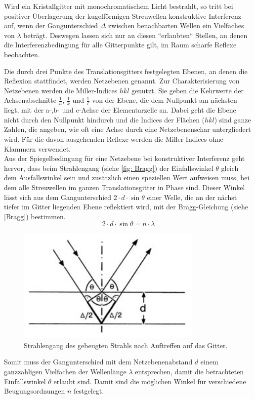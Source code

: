 \documentclass[a4paper,12pt,bibliography=totocnumbered]{scrartcl}
\begin{document}
Wird ein Kristallgitter mit monochromatischem Licht bestrahlt, so tritt bei positiver Überlagerung der kugelförmigen Streuwellen konstruktive Interferenz auf, wenn der Gangunterschied $\Delta$ zwischen benachbarten Wellen ein Vielfaches von $\lambda$ beträgt. \cite{Kristallgitter}
Deswegen lassen sich nur an diesen ``erlaubten`` Stellen, an denen die Interferenzbedingung für alle Gitterpunkte gilt, im Raum scharfe Reflexe beobachten.

Die durch drei Punkte des Translationsgitters festgelegten Ebenen, an denen die Reflexion stattfindet, werden Netzebenen genannt. 
Zur Charakterisierung von Netzebenen werden die Miller-Indices $hkl$ genutzt. Sie geben die Kehrwerte der Achsenabschnitte $\frac{1}{h}$, $\frac{1}{k}$ und $\frac{1}{l}$ von der Ebene, die dem Nullpunkt am nächsten liegt, mit der a-,b- und c-Achse der Elementarzelle an. 
Dabei geht die Ebene nicht durch den Nullpunkt hindurch und die Indices der Flächen ($hkl$) sind ganze Zahlen, die angeben, wie oft eine Achse durch eine Netzebenenschar untergliedert wird. 
Für die davon ausgehenden Reflexe werden die Miller-Indices ohne Klammern verwendet. \\
Aus der Spiegelbedingung für eine Netzebene bei konstruktiver Interferenz geht hervor, dass beim Strahlengang (siehe \autoref{fig: Bragg}) der Einfallswinkel $\theta$ gleich dem Ausfallswinkel sein und zusätzlich einen speziellen Wert aufweisen muss, bei dem alle Streuwellen im ganzen Translationsgitter in Phase sind. 
Dieser Winkel lässt sich aus dem Gangunterschied $2 \cdot d \cdot \sin \theta$ einer Welle, die an der nächst tiefer im Gitter liegenden Ebene reflektiert wird, mit der Bragg-Gleichung (siehe \autoref{Bragg}) bestimmen. 
\begin{equation}
    2 \cdot d \cdot \sin \theta = n \cdot \lambda
    \label{Bragg}
\end{equation}

\begin{figure}[H]
    \centering
    \includegraphics[scale=0.95]{Bilder/Bragg.png}
    \caption{Strahlengang des gebeugten Strahls nach Auftreffen auf das Gitter. \cite{Kristallgitter}}
    \label{fig: Bragg}
\end{figure}
Somit muss der Gangunterschied mit dem Netzebenenabstand $d$ einem  ganzzahligen Vielfachen der Wellenlänge $\lambda$ entsprechen, damit die betrachteten Einfallswinkel $\theta$ erlaubt sind.
Damit sind die möglichen Winkel für verschiedene Beugungsordnungen $n$ festgelegt.
\end{document}
